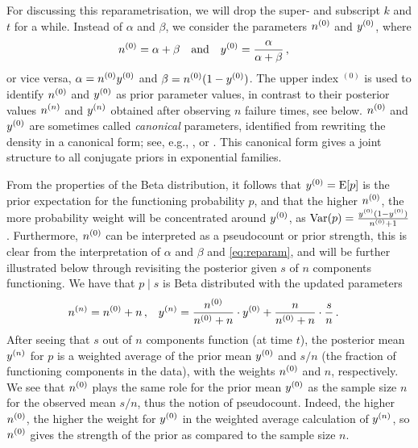 \documentclass[12pt, a4paper]{elsarticle}
\newcommand{\bs}[1]{\boldsymbol{#1}}
\renewcommand{\vec}[1]{{\bs#1}}
\newcommand{\uz}{^{(0)}} %
\newcommand{\E}{\operatorname{E}}
\newcommand{\V}{\operatorname{Var}}
\begin{document}
For discussing this reparametrisation, we will drop the super- and subscript $k$ and $t$ for a while.
Instead of $\alpha$ and $\beta$, we consider the parameters $\nz$ and $\yz$, where
\begin{align}
\nz &= \alpha + \beta &
&\text{and} &
\yz &= \frac{\alpha}{\alpha + \beta} \,,
\label{eq:reparam}
\end{align}
or vice versa, $\alpha = \nz\yz$ and $\beta = \nz(1-\yz)$.
The upper index ${}\uz$ is used to identify $\nz$ and $\yz$ as prior parameter values,
in contrast to their posterior values $n^{(n)}$ and $y^{(n)}$
obtained after observing $n$ failure times, see below.
$\nz$ and $\yz$ are sometimes called \emph{canonical} parameters,
identified from rewriting the density in a canonical form;
see, e.g., \citet[pp.~202 and 272f]{2000:bernardosmith}, or \citet[\S 1.2.3.1]{2013:diss-gw}.
This canonical form gives a joint structure to all conjugate priors in exponential families.

From the properties of the Beta distribution,
it follows that $\yz = \E[p]$ is the prior expectation for the functioning probability $p$,
and that the higher $\nz$, the more probability weight will be concentrated around $\yz$,
as $\V(p) = \frac{\yz (1-\yz)}{\nz + 1}$.
Furthermore, $\nz$ can be interpreted as a pseudocount or prior strength,
this is clear from the interpretation of $\alpha$ and $\beta$ and \eqref{eq:reparam},
and will be further illustrated below through revisiting the posterior
given $s$ of $n$ components functioning.
We have that
$p \mid s$ is Beta distributed with the updated parameters
\begin{align}
\nn &= \nz + n\,, &
\yn &= \frac{\nz}{\nz + n} \cdot \yz + \frac{n}{\nz + n} \cdot \frac{s}{n}\,.
\label{eq:nyupdate}
\end{align}
After seeing that $s$ out of $n$ components function (at time $t$),
the posterior mean $y^{(n)}$ for $p$ is a weighted average of
the prior mean $\yz$ and $s/n$ (the fraction of functioning components in the data),
with the weights $\nz$ and $n$, respectively.
We see that $\nz$ plays the same role for the prior mean $\yz$
as the sample size $n$ for the observed mean $s/n$,
thus the notion of pseudocount.
Indeed, the higher $\nz$, the higher the weight for $\yz$
in the weighted average calculation of $y^{(n)}$,
so $\nz$ gives the strength of the prior as compared to the sample size $n$.
\end{document}
